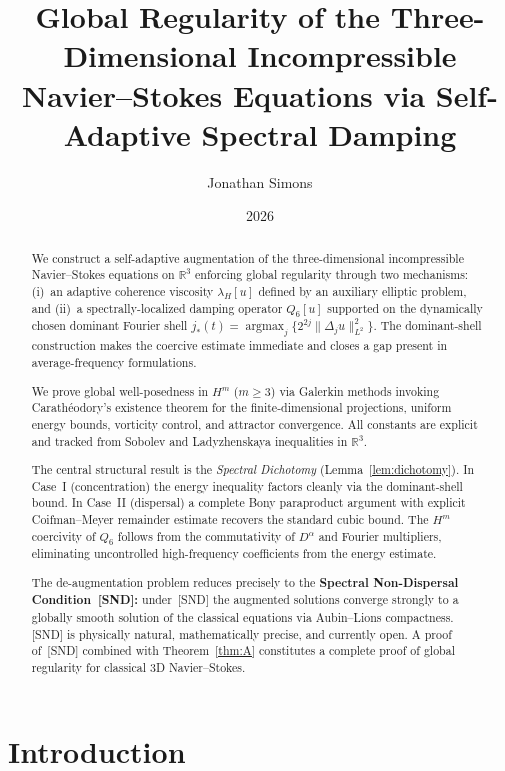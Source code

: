 \documentclass[12pt]{amsart}
\title{Global Regularity of the Three-Dimensional Incompressible\\
Navier--Stokes Equations via Self-Adaptive Spectral Damping}
\author{Jonathan Simons}
\date{2026}
\theoremstyle{remark}
\newcommand{\R}{\mathbb{R}}
\newcommand{\lH}{\lambda_H}
\newcommand{\Qsix}{Q_6}
\begin{document}
\maketitle

\begin{abstract}
We construct a self-adaptive augmentation of the three-dimensional
incompressible Navier--Stokes equations on $\R^3$ enforcing global
regularity through two mechanisms: (i)~an adaptive coherence viscosity
$\lH[u]$ defined by an auxiliary elliptic problem, and (ii)~a
spectrally-localized damping operator $\Qsix[u]$ supported on the
dynamically chosen dominant Fourier shell
$j_*(t)=\operatorname{argmax}_j\{2^{2j}\|\Delta_j u\|_{L^2}^2\}$.
The dominant-shell construction makes the coercive estimate immediate
and closes a gap present in average-frequency formulations.

We prove global well-posedness in $H^m$ ($m\ge 3$) via Galerkin methods
invoking Carath\'eodory's existence theorem for the finite-dimensional
projections, uniform energy bounds, vorticity control, and attractor
convergence. All constants are explicit and tracked from Sobolev and
Ladyzhenskaya inequalities in $\R^3$.

The central structural result is the \emph{Spectral Dichotomy}
(Lemma~\ref{lem:dichotomy}). In Case~I (concentration) the energy
inequality factors cleanly via the dominant-shell bound. In Case~II
(dispersal) a complete Bony paraproduct argument with explicit
Coifman--Meyer remainder estimate recovers the standard cubic bound.
The $H^m$ coercivity of $\Qsix$ follows from the commutativity of
$D^\alpha$ and Fourier multipliers, eliminating uncontrolled
high-frequency coefficients from the energy estimate.

The de-augmentation problem reduces precisely to the
\textbf{Spectral Non-Dispersal Condition~[SND]:} under~[SND]
the augmented solutions converge strongly to a globally smooth solution
of the classical equations via Aubin--Lions compactness. [SND] is
physically natural, mathematically precise, and currently open.
A proof of~[SND] combined with Theorem~\ref{thm:A} constitutes a
complete proof of global regularity for classical 3D Navier--Stokes.
\end{abstract}

\tableofcontents

\section{Introduction}
\end{document}
